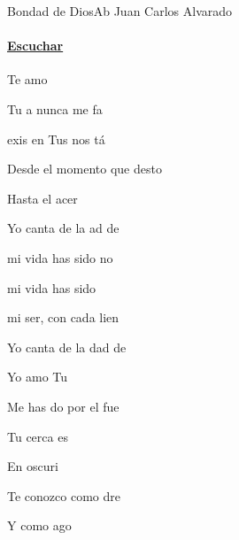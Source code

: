 \documentclass[12pt, spanish]{book}
\begin{document}
    \begin{song}{Bondad de Dios}{Ab}
    {} %
    {Juan Carlos Alvarado}
    {} %
    {}
        \ifChordBk
        \paragraph{\mbox{}\hfill\protect\href{https://open.spotify.com/intl-es/track/3feWC4iQUr9xllyiVh3BQh}{Escuchar}\mbox{}\hfill}
        \fi


        \begin{SBOpGroup}
            Te amo 

            Tu a nunca me fa

             exis en Tus nos tá

            Desde el momento que desto

            Hasta el acer

            Yo canta de la ad de 
        \end{SBOpGroup}

        \begin{SBChorus}
             mi vida has sido no

             mi vida has sido  

             mi ser, con cada lien

            Yo canta de la dad de 
        \end{SBChorus}

        \begin{SBOpGroup}
            Yo amo Tu 

            Me has do por el fue

            Tu cerca es

            En  oscuri

            Te conozco como dre

            Y como ago 


\end{SBOpGroup}
\end{song}
\end{document}
